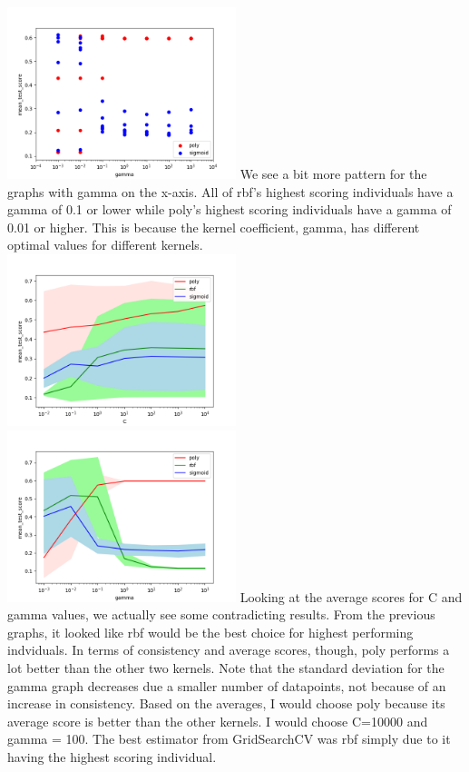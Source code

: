 \documentclass[12pt]{article}
\begin{document}
\includegraphics[width=0.5\textwidth]{SVM_gamma3.png}
We see a bit more pattern for the graphs with gamma on the x-axis. All of rbf's highest scoring individuals have a gamma of 0.1 or lower while poly's highest scoring individuals have a gamma of 0.01 or higher. This is because the kernel coefficient, gamma, has different optimal values for different kernels. \\
\includegraphics[width=0.5\textwidth]{SVM_C_line.png}
\includegraphics[width=0.5\textwidth]{SVM_gamma_line.png}
Looking at the average scores for C and gamma values, we actually see some contradicting results. From the previous graphs, it looked like rbf would be the best choice for highest performing indviduals. In terms of consistency and average scores, though, poly performs a lot better than the other two kernels. Note that the standard deviation for the gamma graph decreases due a smaller number of datapoints, not because of an increase in consistency. Based on the averages, I would choose poly because its average score is better than the other kernels. I would choose C=10000 and gamma = 100. The best estimator from GridSearchCV was rbf simply due to it having the highest scoring individual. 
\end{document}
